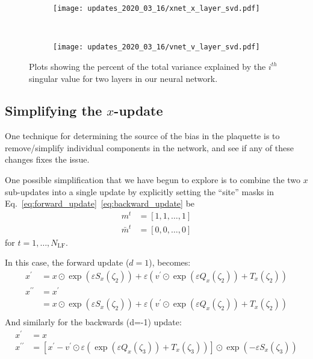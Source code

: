 \begin{itemize}
    \begin{figure}[htpb!]
      \centering
      \begin{subfigure}[b]{0.5\textwidth}
        \centering
        \texttt{[image: updates\_2020\_03\_16/xnet\_x\_layer\_svd.pdf]}
      \end{subfigure}%
      ~
      \begin{subfigure}[b]{0.5\textwidth}
        \centering
        \texttt{[image: updates\_2020\_03\_16/vnet\_v\_layer\_svd.pdf]}
      \end{subfigure}
      \caption{Plots showing the percent of the total variance explained by the
      \(i^{th}\) singular value for two layers in our neural network.}
    \end{figure}
\end{itemize}

\subsection{Simplifying the \texorpdfstring{$x$}{x}-update}%
\label{subsec:simplify_x_update}%
One technique for determining the source of the bias in the plaquette is to
remove/simplify individual components in the network, and see if any of these
changes fixes the issue.

One possible simplification that we have begun to explore is to combine the two
\(x\) sub-updates into a single update by explicitly setting the ``site''
masks in Eq.~\ref{eq:forward_update}~\ref{eq:backward_update} be
%
\begin{align}
  m^{t} &= [1, 1, \ldots, 1]\\
  \bar{m}^{t} &= [0, 0, \ldots, 0]
\end{align}
%
for \(t = 1, \ldots, N_{\mathrm{LF}}\).

In this case, the forward update (\(d = 1\)), becomes:
%
\begin{align}
  x^{\prime} &= x\odot\exp{\left(\varepsilon S_{x}(\zeta_2)\right)} 
    + \varepsilon\left(v^{\prime}\odot\exp{\left(
      \varepsilon Q_{x}(\zeta_{2})\right)} + T_{x}(\zeta_{2})
    \right)\\
  x^{\prime\prime} &= x^{\prime}\\
                   &= x\odot\exp{\left(\varepsilon S_{x}(\zeta_2)\right)} +
                   \varepsilon\left(v^{\prime}\odot\exp{\left( \varepsilon
                   Q_{x}(\zeta_{2})\right)} + T_{x}(\zeta_{2}) \right)\\
\end{align}
%
And similarly for the backwards (d=-1) update:
%
\begin{align}
  x^{\prime} &= x\\
  x^{\prime\prime} &= {\left[x^{\prime}
      - v^{\prime}\odot\varepsilon\left(\exp(\varepsilon Q_{x}(\zeta_{3})) 
      + T_{x}(\zeta_{3})\right)\right]\odot\exp\left({
          -\varepsilon S_{x}(\zeta_{3})
      }\right)}
\end{align}

